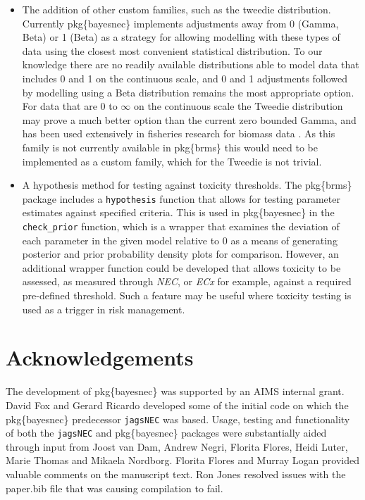 \documentclass[
]{jss}
\begin{document}
\begin{itemize}
\item
  The addition of other custom families, such as the tweedie
  distribution. Currently pkg\{bayesnec\} implements adjustments away
  from 0 (Gamma, Beta) or 1 (Beta) as a strategy for allowing modelling
  with these types of data using the closest most convenient statistical
  distribution. To our knowledge there are no readily available
  distributions able to model data that includes 0 and 1 on the
  continuous scale, and 0 and 1 adjustments followed by modelling using
  a Beta distribution remains the most appropriate option. For data that
  are 0 to \(\infty\) on the continuous scale the Tweedie distribution
  may prove a much better option than the current zero bounded Gamma,
  and has been used extensively in fisheries research for biomass data
  \citep{Shono2008}. As this family is not currently available in
  pkg\{brms\} this would need to be implemented as a custom family,
  which for the Tweedie is not trivial.
\item
  A hypothesis method for testing against toxicity thresholds. The
  pkg\{brms\} package includes a \texttt{hypothesis} function that
  allows for testing parameter estimates against specified criteria.
  This is used in pkg\{bayesnec\} in the \texttt{check\_prior} function,
  which is a wrapper that examines the deviation of each parameter in
  the given model relative to 0 as a means of generating posterior and
  prior probability density plots for comparison. However, an additional
  wrapper function could be developed that allows toxicity to be
  assessed, as measured through \emph{NEC}, or \emph{ECx} for example,
  against a required pre-defined threshold. Such a feature may be useful
  where toxicity testing is used as a trigger in risk management.
\end{itemize}

\hypertarget{acknowledgements}{%
\section{Acknowledgements}\label{acknowledgements}}

The development of pkg\{bayesnec\} was supported by an AIMS internal
grant. David Fox and Gerard Ricardo developed some of the initial code
on which the pkg\{bayesnec\} predecessor \texttt{jagsNEC} was based.
Usage, testing and functionality of both the \texttt{jagsNEC} and
pkg\{bayesnec\} packages were substantially aided through input from
Joost van Dam, Andrew Negri, Florita Flores, Heidi Luter, Marie Thomas
and Mikaela Nordborg. Florita Flores and Murray Logan provided valuable
comments on the manuscript text. Ron Jones resolved issues with the
paper.bib file that was causing compilation to fail.

\renewcommand\refname{References}

\end{document}
